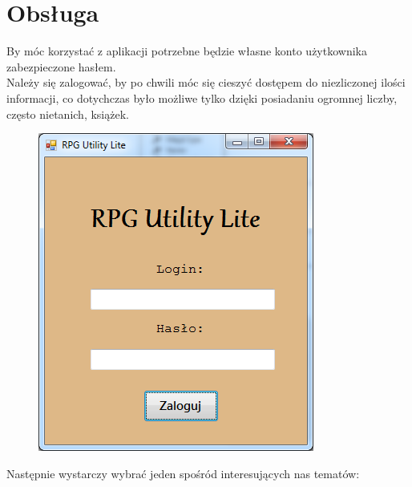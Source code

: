 \documentclass{article}
\begin{document}
\newpage
\section{Obsługa}
By móc korzystać z aplikacji potrzebne będzie własne konto użytkownika zabezpieczone hasłem.
\\Należy się zalogować, by po chwili móc się cieszyć dostępem do niezliczonej ilości informacji, co dotychczas było możliwe tylko dzięki posiadaniu ogromnej liczby, często nietanich, książek.
\\
\begin{figure}[h!]
\begin{center}
    
\centering
\includegraphics[]{ekranpowitalny.png}

\end{center}
\end{figure}
\newpage
Następnie wystarczy wybrać jeden spośród interesujących nas tematów:
\end{document}
